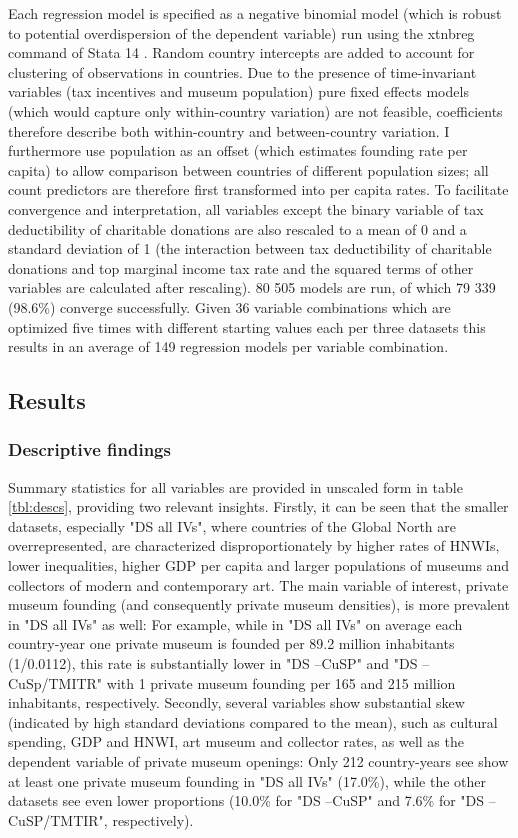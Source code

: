 \documentclass[11pt]{article}
\begin{document}
Each regression model is specified as a negative binomial model (which is robust to potential overdispersion of the dependent variable) run using the xtnbreg command of Stata 14 \parencite{Stata_2015_xtnbreg}. 
Random country intercepts are added to account for clustering of observations in countries.
Due to the presence of time-invariant variables (tax incentives and museum population) pure fixed effects models (which would capture only within-country variation) are not feasible, coefficients therefore describe both within-country and between-country variation.
I furthermore use population as an offset (which estimates founding rate per capita) to allow comparison between countries of different population sizes; all count predictors are therefore first transformed into per capita rates.
To facilitate convergence and interpretation, all variables except the binary variable of tax deductibility of charitable donations are also rescaled to a mean of 0 and a standard deviation of 1 (the interaction between tax deductibility of charitable donations and top marginal income tax rate and the squared terms of other variables are calculated after rescaling).
80 505 models are run, of which 79 339 (98.6\%) converge successfully. 
Given 36 variable combinations which are optimized five times with different starting values each per three datasets this results in an average of 149 regression models per variable combination.


\subsection*{Results}


\subsubsection*{Descriptive findings}


Summary statistics for all variables are provided in unscaled form in table \ref{tbl:descs}, providing two relevant insights. 
Firstly, it can be seen that the smaller datasets, especially "DS all IVs", where countries of the Global North are overrepresented, are characterized disproportionately by higher rates of HNWIs, lower inequalities, higher GDP per capita and larger populations of museums and collectors of modern and contemporary art.
The main variable of interest, private museum founding (and consequently private museum densities), is more prevalent in "DS all IVs" as well: 
For example, while in "DS all IVs" on average each country-year one private museum is founded per 89.2 million inhabitants (1/0.0112), this rate is substantially lower in "DS --CuSP" and "DS --CuSp/TMITR" with 1 private museum founding per 165 and 215 million inhabitants, respectively.
Secondly, several variables show substantial skew (indicated by high standard deviations compared to the mean), such as cultural spending, GDP and HNWI, art museum and collector rates, as well as the dependent variable of private museum openings: 
Only 212 country-years see show at least one private museum founding in "DS all IVs" (17.0\%), while the other datasets see even lower proportions (10.0\% for "DS --CuSP" and 7.6\% for "DS --CuSP/TMTIR", respectively).
\end{document}
